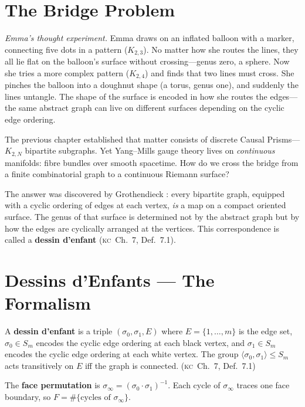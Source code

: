\documentclass[11pt, a4paper, openany]{book}
\newcommand{\KC}[1]{\textnormal{(\textsc{kc}~#1)}}
\begin{document}
\section{The Bridge Problem}

\smallskip\noindent
\textit{Emma's thought experiment.}
Emma draws on an inflated balloon with a marker, connecting five dots in
a pattern ($K_{2,3}$). No matter how she routes the lines, they all lie
flat on the balloon's surface without crossing---genus zero, a sphere.
Now she tries a more complex pattern ($K_{2,4}$) and finds that two
lines must cross. She pinches the balloon into a doughnut shape (a
torus, genus one), and suddenly the lines untangle. The shape of the
surface is encoded in how she routes the edges---the same abstract graph
can live on different surfaces depending on the cyclic edge ordering.
\smallskip

\noindent
The previous chapter established that matter consists of discrete Causal Prisms---$K_{2,N}$ bipartite subgraphs. Yet Yang--Mills gauge theory lives on \emph{continuous} manifolds: fibre bundles over smooth spacetime. How do we cross the bridge from a finite combinatorial graph to a continuous Riemann surface?

The answer was discovered by Grothendieck \cite{grothendieck1984}: every bipartite graph, equipped with a cyclic ordering of edges at each vertex, \emph{is} a map on a compact oriented surface. The genus of that surface is determined not by the abstract graph but by how the edges are cyclically arranged at the vertices. This correspondence is called a \textbf{dessin d'enfant} \cite{lando2004} \KC{Ch.~7, Def.~7.1}.

\section{Dessins d'Enfants --- The Formalism}

\begin{definition}\label{def:dessin}
A \textbf{dessin d'enfant} is a triple $(\sigma_0, \sigma_1, E)$ where $E = \{1, \ldots, m\}$ is the edge set, $\sigma_0 \in S_m$ encodes the cyclic edge ordering at each black vertex, and $\sigma_1 \in S_m$ encodes the cyclic edge ordering at each white vertex. The group $\langle\sigma_0, \sigma_1\rangle \le S_m$ acts transitively on $E$ iff the graph is connected. \KC{Ch.~7, Def.~7.1}
\end{definition}

\begin{definition}\label{def:face-perm}
The \textbf{face permutation} is $\sigma_\infty = (\sigma_0 \cdot \sigma_1)^{-1}$. Each cycle of $\sigma_\infty$ traces one face boundary, so $F = \#\{\text{cycles of } \sigma_\infty\}$.
\end{definition}
\end{document}
